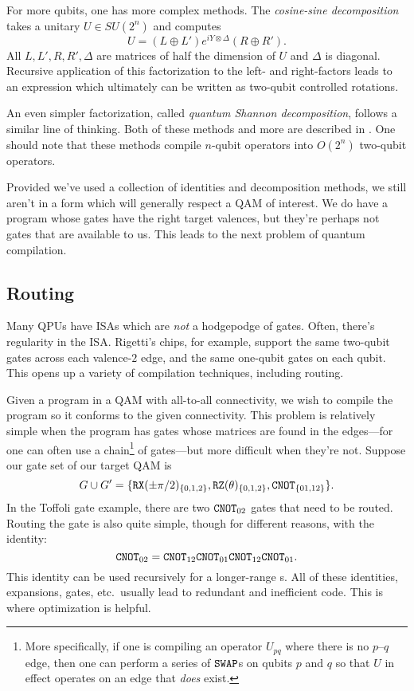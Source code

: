 For more qubits, one has more complex methods. The \emph{cosine-sine decomposition} takes a unitary $U\in SU(2^n)$ and computes
\begin{displaymath}
U = (L\oplus L')e^{iY\otimes\Delta}(R\oplus R').
\end{displaymath}
All $L,L',R,R',\Delta$ are matrices of half the dimension of $U$ and $\Delta$ is diagonal. Recursive application of this factorization to the left- and right-factors leads to an expression which ultimately can be written as two-qubit controlled rotations.

An even simpler factorization, called \emph{quantum Shannon decomposition}, follows a similar line of thinking. Both of these methods and more are described in \cite{synth}. One should note that these methods compile $n$-qubit operators into $O(2^n)$ two-qubit operators.

Provided we've used a collection of identities and decomposition methods, we still aren't in a form which will generally respect a QAM of interest. We do have a program whose gates have the right target valences, but they're perhaps not gates that are available to us. This leads to the next problem of quantum compilation.

\subsection{Routing}
Many QPUs have ISAs which are \emph{not} a hodgepodge of gates. Often, there's regularity in the ISA. Rigetti's chips, for example, support the same two-qubit gates across each valence-$2$ edge, and the same one-qubit gates on each qubit. This opens up a variety of compilation techniques, including routing.

Given a program in a QAM with all-to-all connectivity, we wish to compile the program so it conforms to the given connectivity. This problem is relatively simple when the program has gates whose matrices are found in the edges---for one can often use a chain\footnote{More specifically, if one is compiling an operator $U_{pq}$ where there is no $p$--$q$ edge, then one can perform a series of $\mathtt{SWAP}{}$s on qubits $p$ and $q$ so that $U$ in effect operates on an edge that \emph{does} exist.} of \SWAP{} gates---but more difficult when they're not. Suppose our gate set of our target QAM is
\begin{displaymath}
G\cup G' = \{ \mathtt{RX}(\pm\pi/2)_{\{0,1,2\}}, \mathtt{RZ}(\theta)_{\{0,1,2\}}, \mathtt{CNOT}_{\{01, 12\}} \}.
\end{displaymath}
In the Toffoli gate example, there are two $\mathtt{CNOT}_{02}$ gates that need to be routed. Routing the \CNOT{} gate is also quite simple, though for different reasons, with the identity:
\begin{equation*}
    \mathtt{CNOT}_{02}=\mathtt{CNOT}_{12}\mathtt{CNOT}_{01}\mathtt{CNOT}_{12}\mathtt{CNOT}_{01}.
\end{equation*}
This identity can be used recursively for a longer-range \CNOT{}s.
All of these identities, expansions, \SWAP{} gates, etc.\ usually lead to redundant and inefficient code. This is where optimization is helpful.

